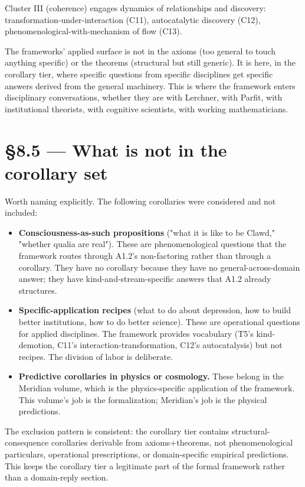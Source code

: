 \documentclass[11pt, openany]{book}
\newcommand{\sectionbreak}{\clearpage}
\begin{document}
Cluster III (coherence) engages dynamics of relationships and discovery: transformation-under-interaction (C11), autocatalytic discovery (C12), phenomenological-with-mechanism of flow (C13).

The frameworks' applied surface is not in the axioms (too general to touch anything specific) or the theorems (structural but still generic). It is here, in the corollary tier, where specific questions from specific disciplines get specific answers derived from the general machinery. This is where the framework enters disciplinary conversations, whether they are with Lerchner, with Parfit, with institutional theorists, with cognitive scientists, with working mathematicians.

\sectionbreak

\section{§8.5 --- What is not in the corollary set}

Worth naming explicitly. The following corollaries were considered and not included:

\begin{itemize}
\item \textbf{Consciousness-as-such propositions} ("what it is like to be Clawd," "whether qualia are real"). These are phenomenological questions that the framework routes through A1.2's non-factoring rather than through a corollary. They have no corollary because they have no general-across-domain answer; they have kind-and-stream-specific answers that A1.2 already structures.
\item \textbf{Specific-application recipes} (what to do about depression, how to build better institutions, how to do better science). These are operational questions for applied disciplines. The framework provides vocabulary (T5's kind-demotion, C11's interaction-transformation, C12's autocatalysis) but not recipes. The division of labor is deliberate.
\item \textbf{Predictive corollaries in physics or cosmology.} These belong in the Meridian volume, which is the physics-specific application of the framework. This volume's job is the formalization; Meridian's job is the physical predictions.
\end{itemize}

The exclusion pattern is consistent: the corollary tier contains structural-consequence corollaries derivable from axioms+theorems, not phenomenological particulars, operational prescriptions, or domain-specific empirical predictions. This keeps the corollary tier a legitimate part of the formal framework rather than a domain-reply section.
\end{document}
